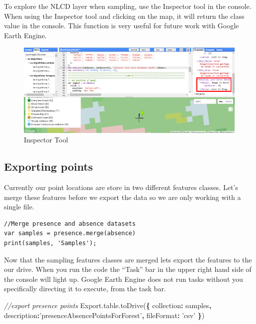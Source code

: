 \documentclass[]{article}
\newenvironment{Shaded}{\begin{snugshade}}{\end{snugshade}}
\newcommand{\DataTypeTok}[1]{\textcolor[rgb]{0.13,0.29,0.53}{#1}}
\newcommand{\StringTok}[1]{\textcolor[rgb]{0.31,0.60,0.02}{#1}}
\newcommand{\CommentTok}[1]{\textcolor[rgb]{0.56,0.35,0.01}{\textit{#1}}}
\newcommand{\VariableTok}[1]{\textcolor[rgb]{0.00,0.00,0.00}{#1}}
\newcommand{\OperatorTok}[1]{\textcolor[rgb]{0.81,0.36,0.00}{\textbf{#1}}}
\newcommand{\AttributeTok}[1]{\textcolor[rgb]{0.77,0.63,0.00}{#1}}
\newcommand{\NormalTok}[1]{#1}
\begin{document}
To explore the NLCD layer when sampling, use the Inspector tool in the
console. When using the Inspector tool and clicking on the map, it will
return the class value in the console. This function is very useful for
future work with Google Earth Engine.

\begin{figure}
\centering
\includegraphics{Inspector_Tool.png}
\caption{Inspector Tool}
\end{figure}

\subsection{Exporting points}\label{exporting-points}

Currently our point locations are store in two different features
classes. Let's merge these features before we export the data so we are
only working with a single file.

\begin{verbatim}
//Merge presence and absence datasets
var samples = presence.merge(absence)
print(samples, 'Samples');
\end{verbatim}

Now that the sampling features classes are merged lets export the
features to the our drive. When you run the code the ``Task'' bar in the
upper right hand side of the console will light up. Google Earth Engine
does not run tasks without you specifically directing it to execute,
from the task bar.

\begin{Shaded}
\begin{Highlighting}[]
\CommentTok{//export presence points}
\VariableTok{Export}\NormalTok{.}\VariableTok{table}\NormalTok{.}\AttributeTok{toDrive}\NormalTok{(}\OperatorTok{\{}
  \DataTypeTok{collection}\OperatorTok{:}\NormalTok{ samples}\OperatorTok{,}
  \DataTypeTok{description}\OperatorTok{:}\StringTok{'presenceAbsencePointsForForest'}\OperatorTok{,}
  \DataTypeTok{fileFormat}\OperatorTok{:} \StringTok{'csv'}
\OperatorTok{\}}\NormalTok{)}
\end{Highlighting}
\end{Shaded}
\end{document}
